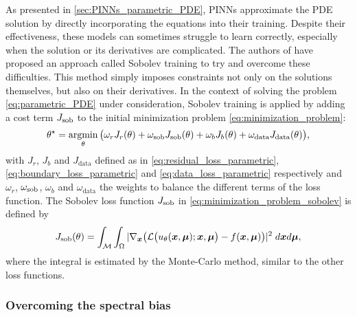 As presented in \cref{sec:PINNs_parametric_PDE}, PINNs approximate the PDE solution by directly incorporating the equations into their training. Despite their effectiveness, these models can sometimes struggle to learn correctly, especially when the solution or its derivatives are complicated.
The authors of \cite{son2021sobolevtrainingphysicsinformed} have proposed an approach called Sobolev training to try and overcome these difficulties. This method simply imposes constraints not only on the solutions themselves, but also on their derivatives.
In the context of solving the problem \eqref{eq:parametric_PDE} under consideration, Sobolev training is applied by adding a cost term $J_\text{\rm sob}$ to the initial minimization problem \eqref{eq:minimization_problem}:
\begin{equation}
	\label{eq:minimization_problem_sobolev}
	\theta^\star = \operatorname*{argmin}_{\theta}
	\big( \omega_r J_r(\theta) + \omega_\text{\rm sob} J_\text{\rm sob}(\theta) + \omega_b J_b(\theta) + \omega_\text{data} J_\text{data}(\theta) \big),
\end{equation}
with $J_r$, $J_b$ and $J_\text{data}$ defined as in \eqref{eq:residual_loss_parametric}, \eqref{eq:boundary_loss_parametric} and \eqref{eq:data_loss_parametric} respectively and $\omega_r$, $\omega_\text{\rm sob}$, $\omega_b$ and $\omega_\text{data}$ the weights to balance the different terms of the loss function.
The Sobolev loss function $J_\text{\rm sob}$ in \eqref{eq:minimization_problem_sobolev} is defined by
\begin{equation}
	\label{eq:sobolev_loss}
	J_\text{\rm sob}(\theta) = \int_{\mathcal{M}}\int_{\Omega} |\nabla_{\bm{x}}\big( \mathcal{L}\big(u_\theta(\bm{x},\bm{\mu});\bm{x},\bm{\mu}\big)-f(\bm{x},\bm{\mu})\big)|^2%
	 \; d\bm{x} d\bm{\mu},
\end{equation}
where the integral is estimated by the Monte-Carlo method, similar to the other loss functions.

\subsubsection{Overcoming the spectral bias}
\label{sec:spectral_bias}

